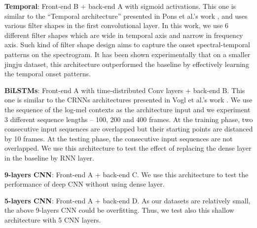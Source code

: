\noindent\textbf{Temporal}: Front-end B + back-end A with sigmoid activations. This one is similar to the ``Temporal architecture'' presented in Pons et al.'s work \cite{Pons2017}, and uses various filter shapes in the first convolutional layer. In this work, we use 6 different filter shapes which are wide in temporal axis and narrow in frequency axis. Such kind of filter shape design aims to capture the onset spectral-temporal patterns on the spectrogram. It has been shown experimentally that on a smaller jingju dataset, this architecture outperformed the baseline by effectively learning the temporal onset patterns.

\noindent\textbf{BiLSTMs}: Front-end A with time-distributed Conv layers + back-end B. This one is similar to the CRNNs architectures presented in Vogl et al.'s work \cite{Vogl2017DrumTV}. We use the sequence of the log-mel contexts as the architecture input and we experiment 3 different sequence lengths -- 100, 200 and 400 frames. At the training phase, two consecutive input sequences are overlapped but their starting points are distanced by 10 frames. At the testing phase, the consecutive input sequences are not overlapped. We use this architecture to test the effect of replacing the dense layer in the baseline by RNN layer.

\noindent\textbf{9-layers CNN}: Front-end A + back-end C. We use this architecture to test the performance of deep CNN without using dense layer.

\noindent\textbf{5-layers CNN}: Front-end A + back-end D. As our datasets are relatively small, the above 9-layers CNN could be overfitting. Thus, we test also this shallow architecture with 5 CNN layers.

\begin{table}[ht!]
\centering
\caption{Total numbers of trainable parameters (TNoTP) of each architecture.}
\label{table:parameters}
\end{table}

